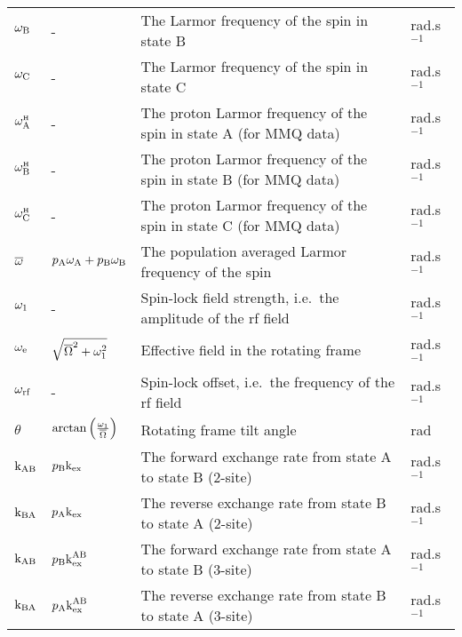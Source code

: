 \begin{center}
\begin{small}
\begin{longtable}{llll}
$\omega_{\textrm{B}}$          & -                              & The Larmor frequency of the spin in state B                                   & rad.s$^{-1}$ \\
$\omega_{\textrm{C}}$          & -                              & The Larmor frequency of the spin in state C                                   & rad.s$^{-1}$ \\
$\omega^{\scriptscriptstyle\mathrm{H}}_{\textrm{A}}$         & -                              & The proton Larmor frequency of the spin in state A (for MMQ data)             & rad.s$^{-1}$ \\
$\omega^{\scriptscriptstyle\mathrm{H}}_{\textrm{B}}$         & -                              & The proton Larmor frequency of the spin in state B (for MMQ data)             & rad.s$^{-1}$ \\
$\omega^{\scriptscriptstyle\mathrm{H}}_{\textrm{C}}$         & -                              & The proton Larmor frequency of the spin in state C (for MMQ data)             & rad.s$^{-1}$ \\
$\overline{\omega}$        & $p_{\textrm{A}}\omega_{\textrm{A}} + p_{\textrm{B}}\omega_{\textrm{B}}$      & The population averaged Larmor frequency of the spin                          & rad.s$^{-1}$ \\
$\omega_1$        & -                              & Spin-lock field strength, i.e.\ the amplitude of the rf field                 & rad.s$^{-1}$ \\
$\omega_{\textrm{e}}$          & $\sqrt{\overline{\Omega}^2 + \omega_1^2}$  & Effective field in the rotating frame                                   & rad.s$^{-1}$ \\
$\omega_{\textrm{rf}}$         & -                              & Spin-lock offset, i.e.\ the frequency of the rf field                         & rad.s$^{-1}$ \\
$\theta$           & $\arctan \left( \frac{\omega_1}{\overline{\Omega}} \right)$  & Rotating frame tilt angle                             & rad \\
$\textrm{k}_{\textrm{AB}}$             & $p_{\textrm{B}}\textrm{k}_{\textrm{ex}}$                      & The forward exchange rate from state A to state B (2-site)                    & rad.s$^{-1}$ \\
$\textrm{k}_{\textrm{BA}}$             & $p_{\textrm{A}}\textrm{k}_{\textrm{ex}}$                      & The reverse exchange rate from state B to state A (2-site)                    & rad.s$^{-1}$ \\
$\textrm{k}_{\textrm{AB}}$             & $p_{\textrm{B}}\textrm{k}_{\textrm{ex}}^{\textrm{AB}}$                    & The forward exchange rate from state A to state B (3-site)                    & rad.s$^{-1}$ \\
$\textrm{k}_{\textrm{BA}}$             & $p_{\textrm{A}}\textrm{k}_{\textrm{ex}}^{\textrm{AB}}$                    & The reverse exchange rate from state B to state A (3-site)                    & rad.s$^{-1}$ \\

\end{longtable}
\end{small}
\end{center}

